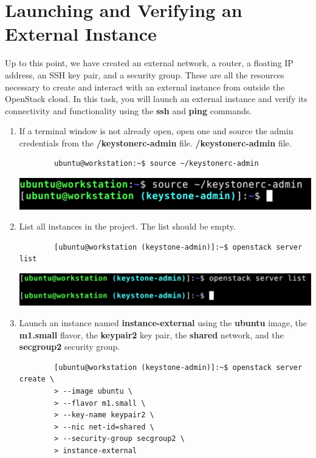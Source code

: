 \documentclass[letterpaper, 12pt]{article}
\begin{document}
\section{Launching and Verifying an External Instance}
\label{sec:launching_an_external_isntance}
Up to this point, we have created an external network, a router, a floating IP address, an SSH key pair, and a security
group. These are all the resources necessary to create and interact with an external instance from outside the OpenStack
cloud. In this task, you will launch an external instance and verify its connectivity and functionality using the
\textbf{ssh} and \textbf{ping} commands.

\begin{enumerate}
    \item If a terminal window is not already open, open one and source the admin credentials from the 
    \textbf{\texttildemid/keystonerc-admin} file.
    \textbf{\texttildemid/keystonerc-admin} file.
    \begin{lstlisting}
        ubuntu@workstation:~$ source ~/keystonerc-admin
    \end{lstlisting}

    \begin{center}
        \includegraphics[width=\linewidth]{images/part6/step1.png}
    \end{center}

    \item List all instances in the project. The list should be empty.
    \begin{lstlisting}
        [ubuntu@workstation (keystone-admin)]:~$ openstack server list
    \end{lstlisting}

    \begin{center}
        \includegraphics[width=\linewidth]{images/part6/step2.png}
    \end{center}

    \item Launch an instance named \textbf{instance-external} using the \textbf{ubuntu} image, the \textbf{m1.small}
    flavor, the \textbf{keypair2} key pair, the \textbf{shared} network, and the \textbf{secgroup2} security
    group.
    \begin{lstlisting}
        [ubuntu@workstation (keystone-admin)]:~$ openstack server create \
        > --image ubuntu \
        > --flavor m1.small \
        > --key-name keypair2 \
        > --nic net-id=shared \
        > --security-group secgroup2 \
        > instance-external
    \end{lstlisting}


\end{enumerate}
\end{document}
